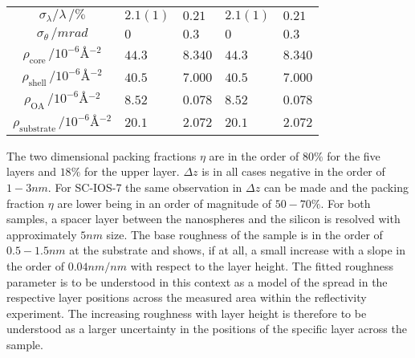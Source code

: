 \documentclass[\main/dresen_thesis.tex]{subfiles}
\begin{document}
\begin{table}[!htbp]
\begin{tabular}{ c | l | l | l | l}
       $\sigma_\lambda / \lambda\, / \unit{\%}$                     & $2.1(1)$  & $0.21$    & $2.1(1)$  & $0.21$\\
       $\sigma_\theta \, / \unit{mrad}$                             & $0$       & $0.3$     & $0$       & $0.3$ \\
       \hline
       $\rho_\mathrm{core}\, / \unit{10^{-6} \angstrom^{-2}}      $   & $44.3$  & $8.340$ & $44.3$ & $8.340$\\
       $\rho_\mathrm{shell}\, / \unit{10^{-6} \angstrom^{-2}}      $  & $40.5$  & $7.000$ & $40.5$ & $7.000$\\
       $\rho_\mathrm{OA}\, / \unit{10^{-6} \angstrom^{-2}}     $      & $8.52$  & $0.078$ & $8.52$ & $0.078$\\
       $\rho_\mathrm{substrate}\, / \unit{10^{-6} \angstrom^{-2}} $   & $20.1$  & $2.072$ & $20.1$ & $2.072$\\
      \hline
    \end{tabular}
  \end{table}
  The two dimensional packing fractions $\eta$ are in the order of $80 \unit{\%}$ for the five layers and $18 \unit{\%}$ for the upper layer.
  $\Delta z$ is in all cases negative in the order of $1 - 3 \unit{nm}$.
  For SC-IOS-7 the same observation in $\Delta z$ can be made and the packing fraction $\eta$ are lower being in an order of magnitude of $50 - 70 \unit{\%}$.
  For both samples, a spacer layer between the nanospheres and the silicon is resolved with approximately $5 \unit{nm}$ size.
  The base roughness of the sample is in the order of $0.5 - 1.5 \unit{nm}$ at the substrate and shows, if at all, a small increase with a slope in the order of $0.04 \unit{nm / nm}$ with respect to the layer height.
  The fitted roughness parameter is to be understood in this context as a model of the spread in the respective layer positions across the measured area within the reflectivity experiment.
  The increasing roughness with layer height is therefore to be understood as a larger uncertainty in the positions of the specific layer across the sample.
\end{document}
